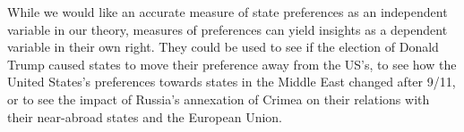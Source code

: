 While we would like an accurate measure of state preferences as an independent variable in our theory, measures of preferences can yield insights as a dependent variable in their own right. They could be used to see if the election of Donald Trump caused states to move their preference away from the US's, to see how the United States's preferences towards states in the Middle East changed after 9/11, or to see the impact of Russia's annexation of Crimea on their relations with their near-abroad states and the European Union.
